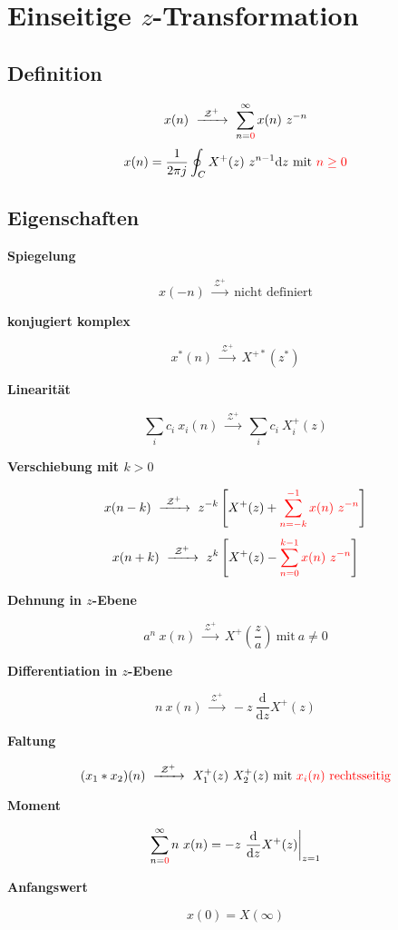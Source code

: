 \documentclass[10pt,a4paper]{article}
\newcommand{\fancyformula}[2]{
	\small\raggedright{\sffamily\textbf{#1}}
	#2
}
\newcommand{\ztransformOneSided}{
	~\xrightarrow{~\mathcal{Z^{+}}~}~
}
\begin{document}
\section*{Einseitige $z$-Transformation}
\subsection*{Definition}
\vspace{-1.5em}
\begin{multicols}{2}
	\noindent
	\[ x(n) \ztransformOneSided \sum_{n = \textcolor{red}{0}}^{\infty} x(n) ~ z^{-n} \]
	\[ x(n) = \frac{1}{2\pi j}\oint_C X^{+}(z) ~ z^{n-1} \mathrm dz ~ \text{mit} ~ \textcolor{red}{n \geq 0}\]
\end{multicols}

\subsection*{Eigenschaften}
\vspace{-1.5em}
\begin{multicols}{2}
	\fancyformula{Spiegelung}{
 		\[ x(-n) \ztransformOneSided \text{nicht definiert} \]
	}

	\fancyformula{konjugiert komplex}{
		\[ x^{*}(n) \ztransformOneSided X^{+*}(z^{*}) \]
	}

	\fancyformula{Linearität}{
		\[ \sum_i c_i ~ x_i(n) \ztransformOneSided \sum_i c_{i} ~ X^{+}_i(z) \]
	}

	\fancyformula{Verschiebung mit $k > 0$}{
		\[ x(n - k) \ztransformOneSided z^{-k} \left[X^{+}(z) + \textcolor{red}{\sum_{n = -k}^{-1} x(n) ~ z^{-n}}\right] \]
		\[ x(n + k) \ztransformOneSided z^k \left[X^{+}(z) - \textcolor{red}{\sum_{n = 0}^{k-1} x(n) ~ z^{-n}}\right] \]
	}
	\fancyformula{Dehnung in $z$-Ebene}{
		\[ a^n ~ x(n) \ztransformOneSided X^+\left(\frac{z}{a}\right) ~ \text{mit} ~ a \neq 0\]
	}

	\fancyformula{Differentiation in $z$-Ebene}{
		\[ n ~ x(n)\ztransformOneSided -z ~ \frac{\mathrm d}{\mathrm dz} X^+(z) \]
	}

	\fancyformula{Faltung}{
		\[ (x_1 * x_2)(n) \ztransformOneSided X_1^+(z) ~ X_2^+(z) ~ \text{mit \textcolor{red}{$x_{i}(n)$ rechtsseitig}} \]
	}

	\fancyformula{Moment}{
		\[ \sum_{n = \textcolor{red}{0}}^{\infty} n ~ x(n) = -z ~ \frac{\mathrm d}{\mathrm dz} X^{+}(z) \bigg |_{z = 1} \]
	}

	\fancyformula{Anfangswert}{
	\[x(0)=X(\infty)\]
	}
\end{multicols}
\end{document}
